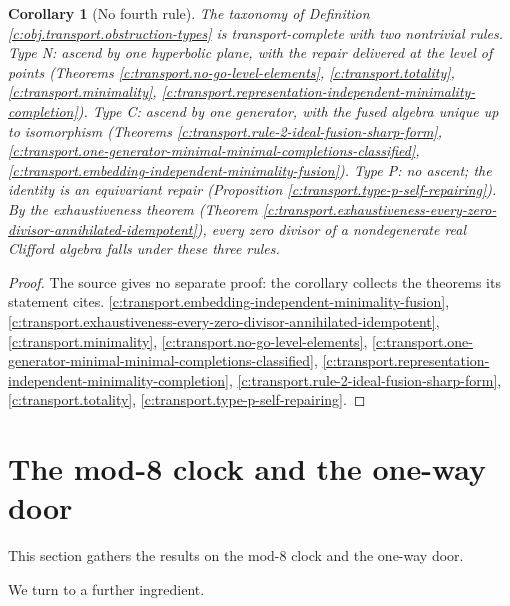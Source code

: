 \documentclass[11pt]{article}
\newtheorem{corollary}[theorem]{Corollary}
\theoremstyle{definition}
\theoremstyle{plain}
\newcommand{\changedmark}[2]{\marginpar{\raggedright\scriptsize\color{#1}#2}}
\begin{document}
\begin{corollary}[No fourth rule]\label{c:transport.no-fourth-rule}
\changedmark{gray}{reworded}
The taxonomy of Definition \ref{c:obj.transport.obstruction-types} is transport-complete with two nontrivial rules. Type N: ascend by one hyperbolic plane, with the repair delivered at the level of points (Theorems \ref{c:transport.no-go-level-elements}, \ref{c:transport.totality}, \ref{c:transport.minimality}, \ref{c:transport.representation-independent-minimality-completion}). Type C: ascend by one generator, with the fused algebra unique up to isomorphism (Theorems \ref{c:transport.rule-2-ideal-fusion-sharp-form}, \ref{c:transport.one-generator-minimal-minimal-completions-classified}, \ref{c:transport.embedding-independent-minimality-fusion}). Type P: no ascent; the identity is an equivariant repair (Proposition \ref{c:transport.type-p-self-repairing}). By the exhaustiveness theorem (Theorem \ref{c:transport.exhaustiveness-every-zero-divisor-annihilated-idempotent}), every zero divisor of a nondegenerate real Clifford algebra falls under these three rules.
\end{corollary}
\begin{proof}
The source gives no separate proof: the corollary collects the theorems its statement cites. \ref{c:transport.embedding-independent-minimality-fusion}, \ref{c:transport.exhaustiveness-every-zero-divisor-annihilated-idempotent}, \ref{c:transport.minimality}, \ref{c:transport.no-go-level-elements}, \ref{c:transport.one-generator-minimal-minimal-completions-classified}, \ref{c:transport.representation-independent-minimality-completion}, \ref{c:transport.rule-2-ideal-fusion-sharp-form}, \ref{c:transport.totality}, \ref{c:transport.type-p-self-repairing}.

\end{proof}

\section{The mod-8 clock and the one-way door}

This section gathers the results on the mod-8 clock and the one-way door.

We turn to a further ingredient.
\end{document}

